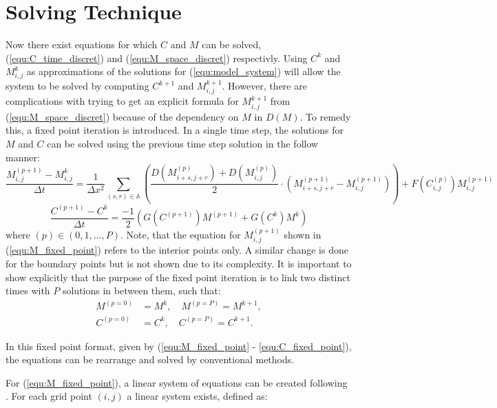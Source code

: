 \section{Solving Technique}

Now there exist equations for which $C$ and $M$ can be solved, (\ref{equ:C_time_discret}) and (\ref{equ:M_space_discret}) respectivly.
Using $C^{k}$ and $M^{k}_{i,j}$ as approximations of the solutions for (\ref{equ:model_system}) will allow the system to be solved by computing $C^{k+1}$ and $M^{k+1}_{i,j}$.
However, there are complications with trying to get an explicit formula for $M^{k+1}_{i,j}$ from (\ref{equ:M_space_discret}) because of the dependency on $M$ in $D(M)$. 
To remedy this, a fixed point iteration is introduced.
In a single time step, the solutions for $M$ and $C$ can be solved using the previous time step solution in the follow manner:
\begin{equation} \label{equ:M_fixed_point}
  \frac{M^{(p+1)}_{i,j} - M^{k}_{i,j}}{\Delta t} = 
    \frac{1}{\Delta x^2} \sum_{(s,r) \in \mathbb{A}}
    \left( \frac{D(M^{(p)}_{i+s,j+r}) + D(M^{(p)}_{i,j})}{2} \cdot
    ( M^{(p+1)}_{i+s, j+r} - M^{(p+1)}_{i,j}) \right) 
    + F(C^{(p)}_{i,j}) M^{(p+1)}_{i,j}
\end{equation}
\begin{equation} \label{equ:C_fixed_point}
  \frac{C^{(p+1)} - C^{k}}{\Delta t} = \frac{-1}{2} ( G(C^{(p+1)}) M^{(p+1)} + G(C^{k}) M^{k} )
\end{equation}
where $(p) \in (0,1,\ldots,P)$.
Note, that the equation for $M^{(p+1)}_{i,j}$ shown in (\ref{equ:M_fixed_point}) refers to the interior points only.
A similar change is done for the boundary points but is not shown due to its complexity.
It is important to show explicitly that the purpose of the fixed point iteration is to link two distinct times with $P$ solutions in between them, such that:
\begin{equation}
  \begin{aligned}
  M^{(p=0)} &= M^{k}, \quad M^{(p=P)} = M^{k+1}, \\
  C^{(p=0)} &= C^{k}, \quad C^{(p=P)} = C^{k+1}.
  \end{aligned}
\end{equation}

In this fixed point format, given by (\ref{equ:M_fixed_point} - \ref{equ:C_fixed_point}), the equations can be rearrange and solved by conventional methods.

For (\ref{equ:M_fixed_point}), a linear system of equations can be created following \cite{saad2003iterativeMethod}.
For each grid point $(i,j)$ a linear system exists, defined as:


